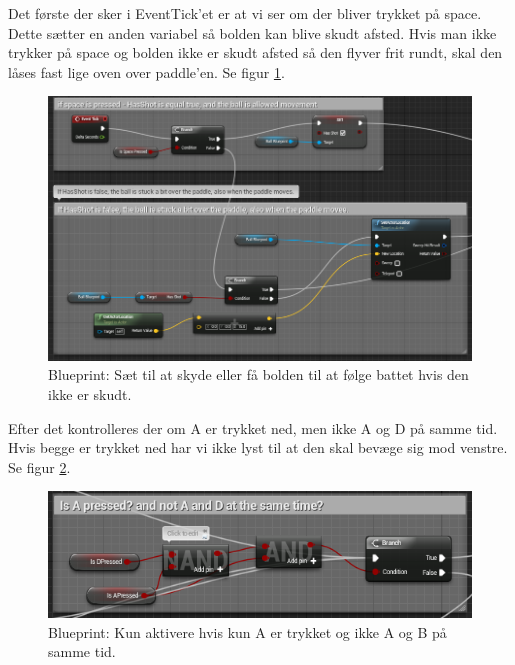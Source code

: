 Det første der sker i EventTick'et er at vi ser om der bliver trykket på space. Dette sætter en anden variabel så bolden kan blive skudt afsted. Hvis man ikke trykker på space og bolden ikke er skudt afsted så den flyver frit rundt, skal den låses fast lige oven over paddle'en. Se figur \ref{dia:paddlelockball}.

\begin{figure}
	\begin{center}
		\caption{Blueprint: Sæt til at skyde eller få bolden til at følge battet hvis den ikke er skudt.}
		\label{dia:paddlelockball}
		\includegraphics[width=0.98\linewidth]{pictures/blueprints/paddle-lock-ball}
		\end{center}
\end{figure}

Efter det kontrolleres der om A er trykket ned, men ikke A og D på samme tid. Hvis begge er trykket ned har vi ikke lyst til at den skal bevæge sig mod venstre. Se figur \ref{dia:paddleisapressed}.

\begin{figure}
	\begin{center}
		\caption{Blueprint: Kun aktivere hvis kun A er trykket og ikke A og B på samme tid.}
		\label{dia:paddleisapressed}
		\includegraphics[width=0.80\linewidth]{pictures/blueprints/paddle-is-a-pressed}
		\end{center}
\end{figure}

